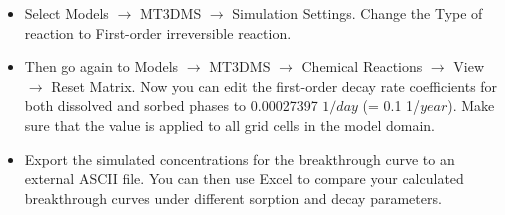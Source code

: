 \begin{itemize}

\item Select Models $\rightarrow$ MT3DMS $\rightarrow$ Simulation Settings. 
Change the Type of reaction to First-order irreversible reaction.

\item Then go again to Models $\rightarrow$ MT3DMS $\rightarrow$ Chemical Reactions 
$\rightarrow$ View $\rightarrow$ Reset Matrix.
Now you can edit the first-order decay rate coefficients for both dissolved and sorbed phases 
to 0.00027397 $1/day$ (= 0.1 1/$year$). Make sure that the value is applied
to all grid cells in the model domain.

\item Export the simulated concentrations for the breakthrough curve to an 
external ASCII file. You can then use Excel to compare your calculated 
breakthrough curves under different
sorption and decay parameters.

\end{itemize}


